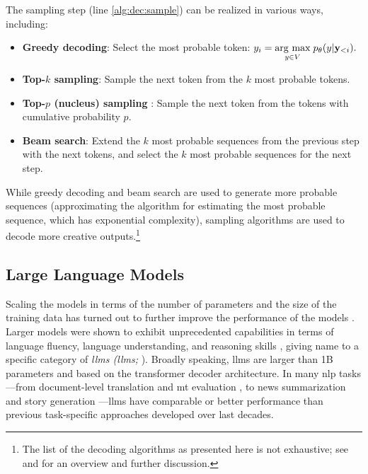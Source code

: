 {\noindent The sampling step (line \ref{alg:dec:sample}) can be realized in various ways, including:
\begin{itemize}
    \item \textbf{Greedy decoding}: Select the most probable token: $y_i = \underset{y \in V}{\operatorname{arg}\,\operatorname{max}}\; p_\theta(y|\mathbf{y}_{<i}).$
    \item \textbf{Top-$k$ sampling}: Sample the next token from the $k$ most probable tokens.
    \item \textbf{Top-$p$ (nucleus) sampling} \cite{holtzman2019curious}: Sample the next token from the tokens with cumulative probability $p$.
    \item \textbf{Beam search}: Extend the $k$ most probable sequences from the previous step with the next tokens, and select the $k$ most probable sequences for the next step.
\end{itemize}
While greedy decoding and beam search are used to generate more probable sequences (approximating the algorithm for estimating the most probable sequence, which has exponential complexity), sampling algorithms are used to decode more creative outputs.\footnote{The list of the decoding algorithms as presented here is not exhaustive; see \citet{zarriess2021decoding} and \citet{wiher2022decoding} for an overview and further discussion.}

\subsection{Large Language Models}
\label{sec:llms}
Scaling the models in terms of the number of parameters and the size of the training data has turned out to further improve the performance of the models \cite{kaplan2020scaling,hoffmann2022training}. Larger models were shown to exhibit unprecedented capabilities in terms of language fluency, language understanding, and reasoning skills \cite{wei2022emergent,bubeck2023sparks}, giving name to a specific category of \emph{\aclp{llm} (\acsp{llm};} \citealp{brown2020language,zhao2023survey}). Broadly speaking, \acp{llm} are larger than 1B parameters and based on the transformer decoder architecture. In many \ac{nlp} tasks---from document-level translation \cite{wang2023documentlevel} and \ac{mt} evaluation \cite{kocmiLargeLanguageModels2023}, to news summarization \cite{zhang2024benchmarking} and story generation \cite{xie2023next}---\acp{llm} have comparable or better performance than previous task-specific approaches developed over last decades.

}
